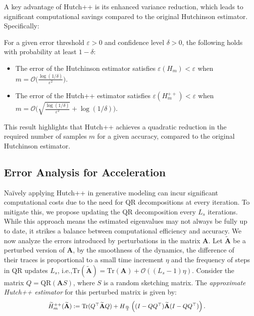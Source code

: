 A key advantage of Hutch++ is its enhanced variance reduction, which leads to significant computational savings compared to the original Hutchinson estimator. Specifically:

\begin{proposition}
    For a given error threshold $\varepsilon > 0$ and confidence level $\delta > 0$, the following holds with probability at least $1 - \delta$:
    \begin{itemize}
        \item The error of the Hutchinson estimator satisfies $\varepsilon(H_m) < \varepsilon$ when $m = \mathcal{O}\Big(\frac{\log(1/\delta)}{\varepsilon^2}\Big)$.
        \item The error of the Hutch++ estimator satisfies $\varepsilon(H_m^{++}) < \varepsilon$ when $m = \mathcal{O}\Big(\sqrt{\frac{\log(1/\delta)}{\varepsilon^2}} + \log(1/\delta)\Big)$.
    \end{itemize}
\end{proposition}

This result highlights that Hutch++ achieves a quadratic reduction in the required number of samples $m$ for a given accuracy, compared to the original Hutchinson estimator.

\subsection{Error Analysis for Acceleration}
Naïvely applying Hutch++ in generative modeling can incur significant computational costs due to the need for QR decompositions at every iteration. To mitigate this, we propose updating the QR decomposition every $L_s$ iterations. While this approach means the estimated eigenvalues may not always be fully up to date, it strikes a balance between computational efficiency and accuracy.
We now analyze the errors introduced by perturbations in the matrix
$\mathbf{A}$. Let $\widetilde{\mathbf{A}}$ be a perturbed version of
$\mathbf{A}$, by the smoothness of the dynamics, the difference of their traces is proportional to a small
time increment $\eta$ and the frequency of steps in QR updates $L_s$, i.e.,$\mathrm{Tr}(\widetilde{\mathbf{A}}) =\mathrm{Tr}(\mathbf{A}) +
\mathcal{O}((L_s-1)\eta)$. Consider the matrix $Q = \mathrm{QR}(\mathbf{A}S)$,
where $S$ is a random sketching matrix. The \emph{approximate Hutch++ estimator}
for this perturbed matrix is given by:
\begin{equation*}
\scalebox{0.9}{$
    \widetilde{H}_m^{++}(\widetilde{\mathbf{A}}) := \mathrm{Tr}(Q^\top \widetilde{\mathbf{A}} Q) + H_{\frac{m}{3}}\left( (I - QQ^\top) \widetilde{\mathbf{A}} (I - QQ^\top) \right).$}
\end{equation*}

